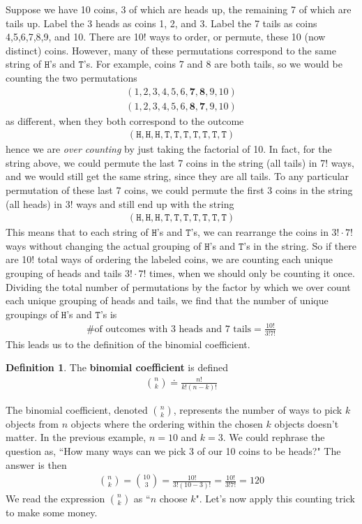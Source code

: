 \documentclass{tufte-book}
\newcommand\hd{\texttt{H}}
\newcommand\tl{\texttt{T}}
\theoremstyle{definition}
\numberwithin{theorem}{section}
\newtheorem{definition}[theorem]{Definition}
\numberwithin{definition}{section}
\numberwithin{lemma}{section}
\numberwithin{corollary}{section}
\numberwithin{proposition}{section}
\numberwithin{remark}{section}
\numberwithin{claim}{section}
\numberwithin{observation}{section}
\numberwithin{fact}{section}
\numberwithin{assumption}{section}
\numberwithin{example}{section}
\numberwithin{exercise}{section}
\begin{document}
Suppose we have 10 coins, 3 of which are heads up, the remaining 7 of which are tails up. Label the 3 heads as coins 1, 2, and 3. Label the 7 tails as coins 4,5,6,7,8,9, and 10. There are 10! ways to order, or permute, these 10 (now distinct) coins. However, many of these permutations correspond to the same string of $\hd$'s and $\tl$'s. For example, coins 7 and 8 are both tails, so we would be counting the two permutations
\begin{align*}
(1,2,3,4,5,6,\textbf{7},\textbf{8},9,10) \\
(1,2,3,4,5,6,\textbf{8},\textbf{7},9,10)
\end{align*}
as different, when they both correspond to the outcome
\begin{align*}
(\hd,\hd,\hd,\tl,\tl,\tl,\tl,\tl,\tl,\tl) 
\end{align*}
hence we are \textit{over counting} by just taking the factorial of 10. In fact, for the string above, we could permute the last 7 coins in the string (all tails) in 7! ways, and we would still get the same string, since they are all tails. To any particular permutation of these last 7 coins, we could permute the first 3 coins in the string (all heads) in 3! ways and still end up with the string
\begin{align*}
(\hd,\hd,\hd,\tl,\tl,\tl,\tl,\tl,\tl,\tl) 
\end{align*}
This means that to each string of $\hd$'s and $\tl$'s, we can rearrange the coins in $3!\cdot 7!$ ways without changing the actual grouping of $\hd$'s and $\tl$'s in the string. So if there are 10! total ways of ordering the labeled coins, we are counting each unique grouping of heads and tails $3!\cdot 7!$ times, when we should only be counting it once. Dividing the total number of permutations by the factor by which we over count each unique grouping of heads and tails, we find that the number of unique groupings of $\hd$'s and $\tl$'s is
\begin{align*}
\text{\# of outcomes with 3 heads and 7 tails} = \frac{10!}{3!7!}
\end{align*}
This leads us to the definition of the binomial coefficient.
\begin{definition}
The \textbf{binomial coefficient} is defined
\begin{align*}
\binom{n}{k} \doteq \frac{n!}{k! (n-k)!}
\end{align*}
\end{definition}
The binomial coefficient, denoted $\binom{n}{k}$, represents the number of ways to pick $k$ objects from $n$ objects where the ordering within the chosen $k$ objects doesn't matter. In the previous example, $n=10$ and $k=3$. We could rephrase the question as, ``How many ways can we pick 3 of our 10 coins to be heads?" The answer is then
\begin{align*}
\binom{n}{k} = \binom{10}{3} = \frac{10!}{3! (10 - 3)!} = \frac{10!}{3!7!} = 120
\end{align*}
We read the expression $\binom{n}{k}$ as ``$n$ choose $k$". Let's now apply this counting trick to make some money.
\end{document}
